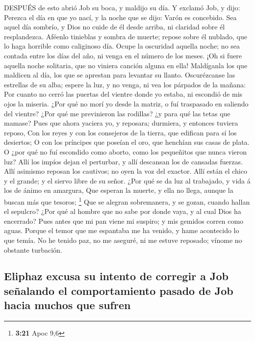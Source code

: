  DESPUÉS de esto abrió Job su boca, y maldijo su día.
 Y exclamó Job, y dijo:  Perezca el día en que
yo nací, y la noche que se dijo: Varón es concebido.  Sea
aquel día sombrío, y Dios no cuide de él desde arriba, ni claridad sobre
él resplandezca.  Aféenlo tinieblas y sombra de muerte;
repose sobre él nublado, que lo haga horrible como caliginoso día.
 Ocupe la oscuridad aquella noche; no sea contada entre los
días del año, ni venga en el número de los meses.  ¡Oh si
fuere aquella noche solitaria, que no viniera canción alguna en ella!
 Maldíganla los que maldicen al día, los que se aprestan
para levantar su llanto.  Oscurézcanse las estrellas de su
alba; espere la luz, y no venga, ni vea los párpados de la mañana:
 Por cuanto no cerró las puertas del vientre donde yo
estaba, ni escondió de mis ojos la miseria.  ¿Por qué no
morí yo desde la matriz, o fuí traspasado en saliendo del vientre?
 ¿Por qué me previnieron las rodillas? ¿y para qué las
tetas que mamase?  Pues que ahora yaciera yo, y reposara;
durmiera, y entonces tuviera reposo,  Con los reyes y con
los consejeros de la tierra, que edifican para sí los desiertos;
 O con los príncipes que poseían el oro, que henchían sus
casas de plata.  O ¿por qué no fuí escondido como aborto,
como los pequeñitos que nunca vieron luz?  Allí los impíos
dejan el perturbar, y allí descansan los de cansadas fuerzas.
 Allí asimismo reposan los cautivos; no oyen la voz del
exactor.  Allí están el chico y el grande; y el siervo
libre de su señor.  ¿Por qué se da luz al trabajado, y vida
á los de ánimo en amargura,  Que esperan la muerte, y ella
no llega, aunque la buscan más que tesoros; \footnote{\textbf{3:21} Apoc
  9,6}  Que se alegran sobremanera, y se gozan, cuando
hallan el sepulcro?  ¿Por qué al hombre que no sabe por
donde vaya, y al cual Dios ha encerrado?  Pues antes que mi
pan viene mi suspiro; y mis gemidos corren como aguas. 
Porque el temor que me espantaba me ha venido, y hame acontecido lo que
temía.  No he tenido paz, no me aseguré, ni me estuve
reposado; vínome no obstante turbación.

\hypertarget{eliphaz-excusa-su-intento-de-corregir-a-job-seuxf1alando-el-comportamiento-pasado-de-job-hacia-muchos-que-sufren}{%
\subsection{Eliphaz excusa su intento de corregir a Job señalando el
comportamiento pasado de Job hacia muchos que
sufren}\label{eliphaz-excusa-su-intento-de-corregir-a-job-seuxf1alando-el-comportamiento-pasado-de-job-hacia-muchos-que-sufren}}

